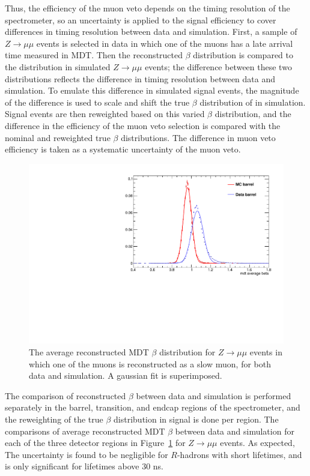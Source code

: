 Thus, the efficiency of the muon veto depends on the timing resolution of the spectrometer, so an uncertainty is applied to the signal efficiency to cover differences in timing resolution between data and simulation. 
First, a sample of $Z\rightarrow\mu\mu$ events is selected in data in which one of the muons has a late arrival time measured in \ac{MDT}. 
Then the reconstructed $\beta$ distribution is compared to the distribution in simulated $Z\rightarrow\mu\mu$ events; the difference between these two distributions reflects the difference in timing resolution between data and simulation.
To emulate this difference in simulated signal events, the magnitude of the difference is used to scale and shift the true $\beta$ distribution of \rhadrons in simulation. 
Signal events are then reweighted based on this varied $\beta$ distribution, and the difference in the efficiency of the muon veto selection is compared with the nominal and reweighted true $\beta$ distributions. 
The difference in muon veto efficiency is taken as a systematic uncertainty of the muon veto. 

\begin{figure}
\centering
\includegraphics[width=\fullfig]{figures/beta_muonveto.pdf}
\caption{The average reconstructed MDT $\beta$ distribution for $Z\rightarrow\mu\mu$ events in which one of the muons is reconstructed as a slow muon, for both data and simulation. A gaussian fit is superimposed.}
\label{fig:mdt_beta}
\end{figure}
 
The comparison of reconstructed $\beta$ between data and simulation is performed separately in the barrel, transition, and endcap regions of the spectrometer, and the reweighting of the true $\beta$ distribution in signal is done per region. 
The comparisons of average reconstructed \ac{MDT} $\beta$ between data and simulation for each of the three detector regions in Figure~\ref{fig:mdt_beta} for $Z\rightarrow\mu\mu$ events.
As expected, The uncertainty is found to be negligible for $R$-hadrons with short lifetimes, and is only significant for lifetimes above 30 ns.


